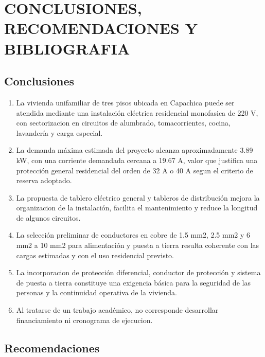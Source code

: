 \chapter{CONCLUSIONES, RECOMENDACIONES Y BIBLIOGRAFIA}

\section{Conclusiones}

\begin{enumerate}
  \item La vivienda unifamiliar de tres pisos ubicada en Capachica puede ser atendida mediante una instalación eléctrica residencial monofasica de 220 V, con sectorizacion en circuitos de alumbrado, tomacorrientes, cocina, lavandería y carga especial.
  \item La demanda máxima estimada del proyecto alcanza aproximadamente 3.89 kW, con una corriente demandada cercana a 19.67 A, valor que justifica una protección general residencial del orden de 32 A o 40 A segun el criterio de reserva adoptado.
  \item La propuesta de tablero eléctrico general y tableros de distribución mejora la organizacion de la instalación, facilita el mantenimiento y reduce la longitud de algunos circuitos.
  \item La selección preliminar de conductores en cobre de 1.5 mm2, 2.5 mm2 y 6 mm2 a 10 mm2 para alimentación y puesta a tierra resulta coherente con las cargas estimadas y con el uso residencial previsto.
  \item La incorporacion de protección diferencial, conductor de protección y sistema de puesta a tierra constituye una exigencia básica para la seguridad de las personas y la continuidad operativa de la vivienda.
  \item Al tratarse de un trabajo académico, no corresponde desarrollar financiamiento ni cronograma de ejecucion.
\end{enumerate}

\section{Recomendaciones}

